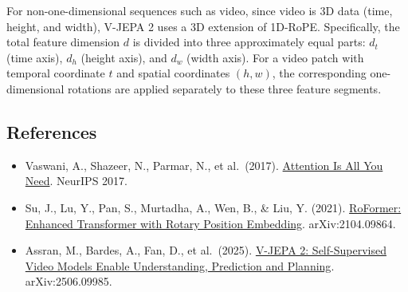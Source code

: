 For non-one-dimensional sequences such as video, since video is 3D data (time, height, and width), V-JEPA 2 uses a 3D extension of 1D-RoPE. Specifically, the total feature dimension \(d\) is divided into three approximately equal parts: \(d_t\) (time axis), \(d_h\) (height axis), and \(d_w\) (width axis). For a video patch with temporal coordinate \(t\) and spatial coordinates \((h,w)\), the corresponding one-dimensional rotations are applied separately to these three feature segments.

\FloatBarrier
{}
\hypertarget{references-70}{%
\subsection{References}\label{references-70}}

\vspace{0.25em}
\begin{itemize}
\tightlist
\item
  Vaswani, A., Shazeer, N., Parmar, N., et al.~(2017). \href{https://arxiv.org/abs/1706.03762}{Attention Is All You Need}. NeurIPS 2017.
\item
  Su, J., Lu, Y., Pan, S., Murtadha, A., Wen, B., \& Liu, Y. (2021). \href{https://arxiv.org/abs/2104.09864}{RoFormer: Enhanced Transformer with Rotary Position Embedding}. arXiv:2104.09864.
\item
  Assran, M., Bardes, A., Fan, D., et al.~(2025). \href{https://arxiv.org/abs/2506.09985}{V-JEPA 2: Self-Supervised Video Models Enable Understanding, Prediction and Planning}. arXiv:2506.09985.
\end{itemize}

\clearpage
